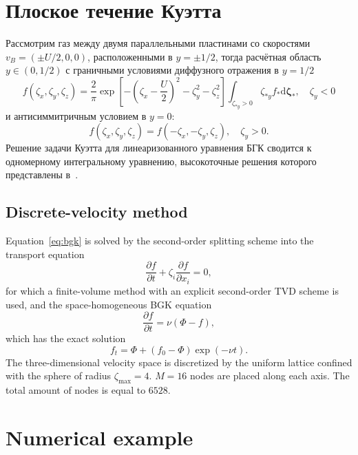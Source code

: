 \documentclass{article}
\theoremstyle{plain}
\newcommand{\dd}{\mathrm{d}}
\newcommand{\pder}[2][]{\frac{\partial#1}{\partial#2}}
\newcommand{\dzeta}{\boldsymbol{\dd\zeta}}
\begin{document}
\section{Плоское течение Куэтта}

Рассмотрим газ между двумя параллельными пластинами со скоростями \(v_B = (\pm{U}/2,0,0)\),
расположенными в \(y=\pm1/2\), тогда расчётная область \(y\in(0,1/2)\) с граничными условиями
диффузного отражения в \(y=1/2\)
\begin{equation}\label{eq:diffuse}
    f(\zeta_x,\zeta_y,\zeta_z) = \frac2{\pi} \exp\left[-\left(\zeta_x-\frac{U}{2}\right)^2-\zeta_y^2-\zeta_z^2\right]
        \int_{\zeta_{*y}>0}\zeta_{*y} f_* \dzeta_*, \quad \zeta_y<0
\end{equation}
и антисиммитричным условием в \(y=0\):
\begin{equation}\label{eq:antisymmetry}
    f(\zeta_x,\zeta_y,\zeta_z) = f(-\zeta_x,-\zeta_y,\zeta_z), \quad \zeta_y>0.
\end{equation}
Решение задачи Куэтта для линеаризованного уравнения БГК сводится к одномерному интегральному уравнению,
высокоточные решения которого представлены в~\cite{Luo2015, Luo2016}.

\subsection{Discrete-velocity method}

Equation~\eqref{eq:bgk} is solved by the second-order splitting scheme into the transport equation
\begin{equation}\label{eq:split_transport}
    \pder[f]{t} + \zeta_i\pder[f]{x_i} = 0,
\end{equation}
for which a finite-volume method with an explicit second-order TVD scheme is used,
and the space-homogeneous BGK equation
\begin{equation}\label{eq:homogeneous}
    \pder[f]{t} = \nu (\Phi-f),
\end{equation}
which has the exact solution
\begin{equation}\label{eq:exact_bgk}
    f_t = \Phi + (f_0-\Phi)\exp(-\nu t).
\end{equation}
The three-dimensional velocity space is discretized by the uniform lattice confined with the sphere of radius \(\zeta_{\max}=4\).
\(M=16\) nodes are placed along each axis. The total amount of nodes is equal to \(6528\).

\section{Numerical example}
\end{document}
